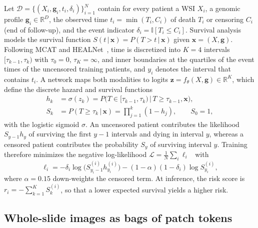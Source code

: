 \documentclass[10pt,twocolumn,letterpaper]{article}
\newcommand{\R}{\mathbb{R}}
\newcommand{\ind}{\mathbb{I}}
\begin{document}
Let $\mathcal{D}=\{(X_i,\mathbf{g}_i,t_i,\delta_i)\}_{i=1}^{N}$ contain for every patient a WSI $X_i$, a genomic profile $\mathbf{g}_i\in\R^{D}$, the observed time $t_i=\min(T_i,C_i)$ of death $T_i$ or censoring $C_i$ (end of follow-up), and the event indicator $\delta_i=\ind[T_i\le C_i]$. Survival analysis models the survival function $S(t\,|\,\mathbf{x})=P(T>t\,|\,\mathbf{x})$ given $\mathbf{x}=(X,\mathbf{g})$. Following MCAT and HEALNet~\cite{chen2021mcat,hemker2024healnet}, time is discretized into $K=4$ intervals $[\tau_{k-1},\tau_k)$ with $\tau_0=0$, $\tau_K=\infty$, and inner boundaries at the quartiles of the event times of the uncensored training patients, and $y_i$ denotes the interval that contains $t_i$. A network maps both modalities to logits $\mathbf{z}=f_\theta(X,\mathbf{g})\in\R^{K}$, which define the discrete hazard and survival functions
\begin{align}
  h_k &= \sigma(z_k) = P\big(T\in[\tau_{k-1},\tau_k)\,\big|\,T\ge\tau_{k-1},\mathbf{x}\big), \label{eq:hazard}\\
  S_k &= P(T\ge\tau_k\,|\,\mathbf{x}) = \textstyle\prod_{j=1}^{k}(1-h_j), \qquad S_0=1, \label{eq:survival}
\end{align}
with the logistic sigmoid $\sigma$. An uncensored patient contributes the likelihood $S_{y-1}h_y$ of surviving the first $y-1$ intervals and dying in interval $y$, whereas a censored patient contributes the probability $S_y$ of surviving interval $y$. Training therefore minimizes the negative log-likelihood $\mathcal{L}=\frac{1}{N}\sum_{i}\ell_i$~\cite{chen2021mcat,hemker2024healnet} with
\begin{equation}
  \ell_i = -\delta_i\log\big(S^{(i)}_{y_i-1}h^{(i)}_{y_i}\big)-(1-\alpha)(1-\delta_i)\log S^{(i)}_{y_i}, \label{eq:nll}
\end{equation}
where $\alpha=0.15$ down-weights the censored term. At inference, the risk score is $r_i=-\sum_{k=1}^{K}S^{(i)}_k$, so that a lower expected survival yields a higher risk.

\subsection{Whole-slide images as bags of patch tokens}
\label{sec:wsi}
\end{document}
